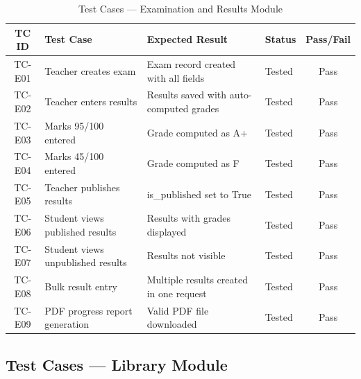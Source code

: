 \begin{table}[H]
\centering
\caption{Test Cases --- Examination and Results Module}
\label{tab:test_exams}
\footnotesize
\begin{tabular}{|c|p{4cm}|p{4cm}|p{2cm}|c|}
\hline
\textbf{TC ID} & \textbf{Test Case} & \textbf{Expected Result} & \textbf{Status} & \textbf{Pass/Fail} \\
\hline
TC-E01 & Teacher creates exam & Exam record created with all fields & Tested & Pass \\
\hline
TC-E02 & Teacher enters results & Results saved with auto-computed grades & Tested & Pass \\
\hline
TC-E03 & Marks 95/100 entered & Grade computed as A+ & Tested & Pass \\
\hline
TC-E04 & Marks 45/100 entered & Grade computed as F & Tested & Pass \\
\hline
TC-E05 & Teacher publishes results & is\_published set to True & Tested & Pass \\
\hline
TC-E06 & Student views published results & Results with grades displayed & Tested & Pass \\
\hline
TC-E07 & Student views unpublished results & Results not visible & Tested & Pass \\
\hline
TC-E08 & Bulk result entry & Multiple results created in one request & Tested & Pass \\
\hline
TC-E09 & PDF progress report generation & Valid PDF file downloaded & Tested & Pass \\
\hline
\end{tabular}
\end{table}

\subsection{Test Cases --- Library Module}

